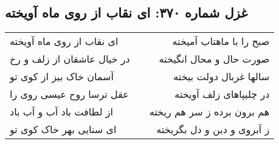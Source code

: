 \begin{center}
\section*{غزل شماره ۳۷۰: ای نقاب از روی ماه آویخته}
\label{sec:370}
\begin{longtable}{l p{0.5cm} r}
ای نقاب از روی ماه آویخته
&&
صبح را با ماهتاب آمیخته
\\
در خیال عاشقان از زلف و رخ
&&
صورت حال و محال انگیخته
\\
آسمان خاک بیز از کوی تو
&&
سالها غربال دولت بیخته
\\
عقل ترسا روح عیسی روی را
&&
در چلیپاهای زلف آویخته
\\
از لطافت باد آب و آب باد
&&
هم برون برده ز سر هم ریخته
\\
ای سنایی بهر خاک کوی تو
&&
ز آبروی و دین و دل بگریخته
\\
\end{longtable}
\end{center}
